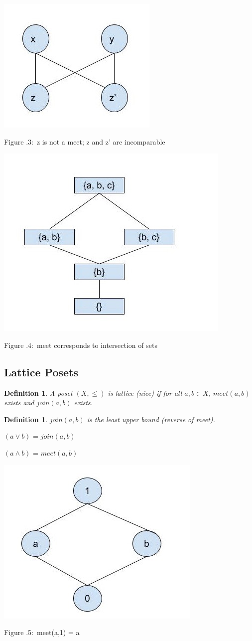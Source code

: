 \documentclass[twoside]{article}
\newcounter{lecnum}
\newcommand{\fig}[3]{
			\vspace{#2}
			\begin{center}
			Figure \thelecnum.#1:~#3
			\end{center}
	}
\newtheorem{definition}[theorem]{Definition}
\begin{document}
\begin{minipage}[]{\textwidth}
\centering
\includegraphics[width=.5\textwidth]{incomparable.jpg}
\end{minipage}
\fig{3}{0cm}{z is not a meet; z and z' are incomparable}

\begin{minipage}[]{\textwidth}
\centering
\includegraphics[width=.5\textwidth]{meet_intersection.jpg}
\end{minipage}
\fig{4}{0cm}{meet corresponds to intersection of sets}

\subsection{Lattice Posets}
\begin{definition}
A poset $(X, \leq)$ is lattice (nice) if for all $a,b \in X$, $meet(a, b)$ exists and $join(a,b)$ exists.
\end{definition}

\begin{definition}
$join(a,b)$ is the least upper bound (reverse of meet).
\end{definition}

$(a \vee b)$ = $join(a,b)$

$(a \wedge b)$ = $meet(a,b)$


\begin{minipage}[]{\textwidth}
\centering
\includegraphics[width=.5\textwidth]{lattice1.jpg}
\end{minipage}
\fig{5}{0cm}{meet(a,1) = a}
\end{document}
